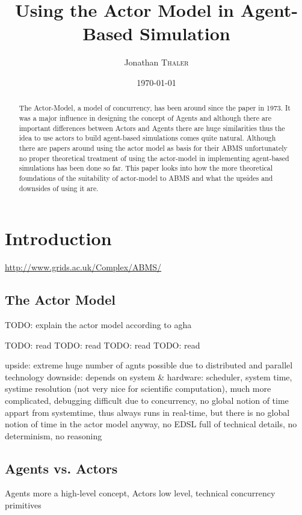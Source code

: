 \documentclass{article}
\title{Using the Actor Model in Agent-Based Simulation} %
\author{Jonathan \textsc{Thaler}}
\date{\today}
\begin{document}
\maketitle 

\begin{abstract}
The Actor-Model, a model of concurrency, has been around since the paper \cite{Hewitt_1973} in 1973. It was a major influence in designing the concept of Agents and although there are important differences between Actors and Agents there are huge similarities thus the idea to use actors to build agent-based simulations comes quite natural. Although there are papers around using the actor model as basis for their ABMS unfortunately no proper theoretical treatment of using the actor-model in implementing agent-based simulations has been done so far. This paper looks into how the more theoretical foundations of the suitability of actor-model to ABMS and what the upsides and downsides of using it are.
\end{abstract}

\section{Introduction}
\url{http://www.grids.ac.uk/Complex/ABMS/}

\subsection{The Actor Model}
TODO: explain the actor model according to agha

TODO: read \cite{Hewitt_1973}
TODO: read \cite{Greif_1975}
TODO: read \cite{Clinger_1981}
TODO: read \cite{Agha_1986}

upside: extreme huge number of agnts possible due to distributed and parallel technology 
downside: depends on system \& hardware: scheduler, system time, systime resolution (not very nice for scientific computation), much more complicated, debugging difficult due to concurrency, no global notion of time appart from systemtime, thus always runs in real-time, but there is no global notion of time in the actor model anyway, no EDSL full of technical details, no determinism, no reasoning

\subsection{Agents vs. Actors}
Agents more a high-level concept, Actors low level, technical concurrency primitives
\end{document}
